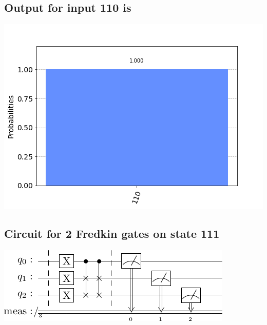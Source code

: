 \documentclass[a4paper]{article}
\begin{document}
\begin{answer}[Question 1 a]
        \subsection*{Output for input 110 is}
        \includegraphics[scale = 0.5]{1a110-out.png}
        \subsection*{Circuit for 2 Fredkin gates on state 111}
        \includegraphics[scale = 0.5]{1a111.png}

\end{answer}
\end{document}
